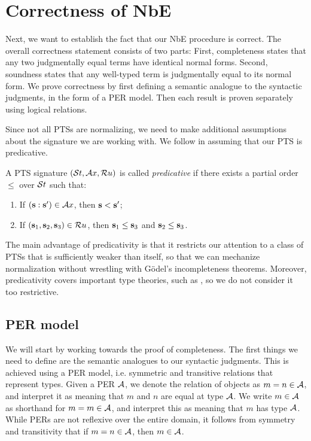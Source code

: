\section{Correctness of NbE}

Next, we want to establish the fact that our \ac{NbE} procedure is correct.
The overall correctness statement consists of two parts:
First, completeness states that any two judgmentally equal terms have identical normal forms.
Second, soundness states that any well-typed term is judgmentally equal to its normal form.
We prove correctness by first defining a semantic analogue to the syntactic judgments, in the form of a \ac{PER} model.
Then each result is proven separately using logical relations.

Since not all \acp{PTS} are normalizing, we need to make additional assumptions about the signature we are working with.
We follow \citet{FP15} in assuming that our \ac{PTS} is predicative.

\begin{definition}[Predicativity]
  A \ac{PTS} signature $(\mathcal{S}t, \mathcal{A}x, \mathcal{R}u)$ is called \textit{predicative} if there exists a partial order $\leq$ over $\mathcal{S}t$ such that:
  \begin{enumerate}
  \item If $(\textbf{s} : \textbf{s}') \in \mathcal{A}x$, then $\textbf{s} < \textbf{s}'$;
  \item If $(\textbf{s}_1, \textbf{s}_2, \textbf{s}_3) \in \mathcal{R}u$, then $\textbf{s}_1 \leq \textbf{s}_3$ and $\textbf{s}_2 \leq \textbf{s}_3$.
  \end{enumerate}
\end{definition}

The main advantage of predicativity is that it restricts our attention to a class of \acp{PTS} that is sufficiently weaker than \rocq itself,
  so that we can mechanize normalization without wrestling with G{\"o}del's incompleteness theorems.
Moreover, predicativity covers important type theories, such as \mltt, so we do not consider it too restrictive.




\subsection{PER model}

We will start by working towards the proof of completeness.
The first things we need to define are the semantic analogues to our syntactic judgments.
This is achieved using a \ac{PER} model, i.e. symmetric and transitive relations that represent types.
Given a \ac{PER} $\mathcal{A}$, we denote the relation of objects as $m = n \in \mathcal{A}$, and interpret it as meaning that $m$ and $n$ are equal at type $\mathcal{A}$.
We write $m \in \mathcal{A}$ as shorthand for $m = m \in \mathcal{A}$, and interpret this as meaning that $m$ has type $\mathcal{A}$.
While \acp{PER} are not reflexive over the entire domain, it follows from symmetry and transitivity that if $m = n \in \mathcal{A}$, then $m \in \mathcal{A}$.

